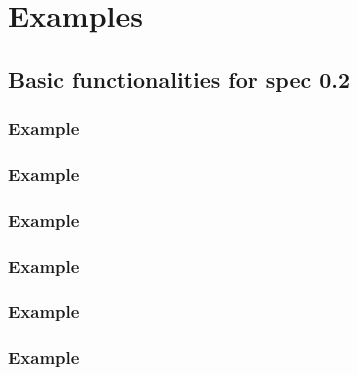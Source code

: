 
\appendix


\chapter{Examples}
\label{chap:examples}



\section{Basic functionalities for spec 0.2}


\subsection{Example}


\subsection{Example}


\subsection{Example}


\subsection{Example}


\subsection{Example}


\subsection{Example}


